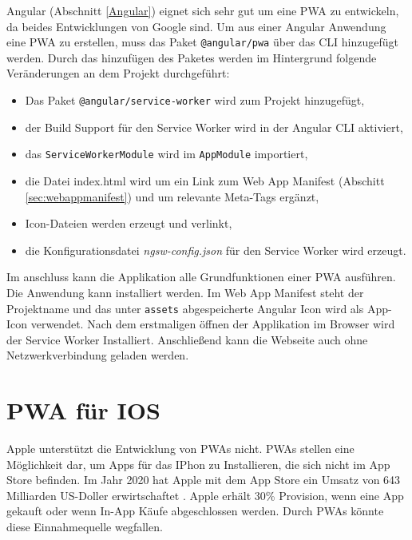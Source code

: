 Angular (Abschnitt \ref{Angular}) eignet sich sehr gut um eine PWA zu entwickeln, da beides Entwicklungen von Google sind. 
Um aus einer Angular Anwendung eine PWA zu erstellen, muss das Paket \texttt{@angular/pwa} über das \ac{CLI} hinzugefügt werden.
Durch das hinzufügen des Paketes werden im Hintergrund folgende Veränderungen an dem Projekt durchgeführt: 
\begin{itemize}
    \item Das Paket \texttt{@angular/service-worker} wird zum Projekt hinzugefügt,
    \item der Build Support für den Service Worker wird in der Angular CLI aktiviert,
    \item das \texttt{ServiceWorkerModule} wird im \texttt{AppModule} importiert,
    \item die Datei index.html wird um ein Link zum Web App Manifest (Abschitt \ref{sec:webappmanifest}) und um relevante Meta-Tags ergänzt,
    \item Icon-Dateien werden erzeugt und verlinkt,
    \item die Konfigurationsdatei \textit{ngsw-config.json} für den Service Worker wird erzeugt. 
\end{itemize}

Im anschluss kann die Applikation alle Grundfunktionen einer PWA ausführen. Die Anwendung kann installiert werden. Im Web App Manifest steht der Projektname und das unter \texttt{assets} abgespeicherte Angular Icon wird als App-Icon verwendet. Nach dem erstmaligen öffnen der Applikation im Browser wird der Service Worker Installiert. Anschließend kann die Webseite auch ohne Netzwerkverbindung geladen werden.  



\section{PWA für IOS}

Apple unterstützt die Entwicklung von PWAs nicht. PWAs stellen  eine Möglichkeit dar, um Apps für das IPhon zu Installieren, die sich nicht im App Store befinden. Im Jahr 2020 hat Apple mit dem App Store ein Umsatz von 643 Milliarden US-Doller erwirtschaftet \cite{Kirchenbauer2021}. Apple erhält 30\% Provision, wenn eine App gekauft oder wenn In-App Käufe abgeschlossen werden. Durch PWAs könnte diese Einnahmequelle wegfallen. 

